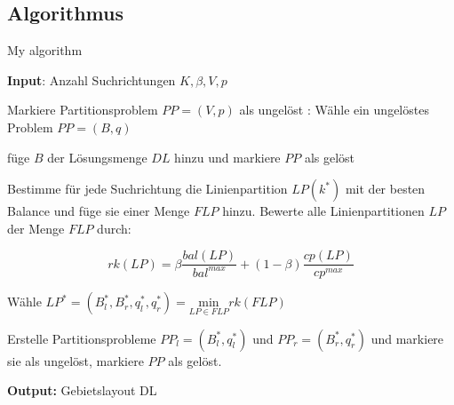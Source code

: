     \subsection{Algorithmus} %
    \label{sub:algorithmus}

      \begin{algorithm}
        \caption{My algorithm}\label{euclid}
        \textbf{Input}: Anzahl Suchrichtungen $K, \beta, V, p$
        \begin{algorithmic}[1]
          \State Markiere Partitionsproblem $PP = (V, p)$ als ungelöst
          :
            \State Wähle ein ungelöstes Problem $PP = (B, q)$
            
              \State füge $B$ der Lösungsmenge $DL$ hinzu und markiere $PP$ als gelöst
            \EndIf

              \State Bestimme für jede Suchrichtung die Linienpartition $LP(k^*)$ mit der besten Balance und füge sie einer Menge $FLP$ hinzu.
              \State Bewerte alle Linienpartitionen $LP$ der Menge $FLP$ durch:
              
                \begin{equation*}
                  rk(LP) = \beta\frac{bal(LP)}{bal^{max}} + (1 - \beta)\frac{cp(LP)}{cp^{max}}
                \end{equation*}

              \State Wähle $LP^{*} = (B_{l}^{*}, B_{r}^{*}, q_{l}^{*}, q_{r}^{*}) = \underset{LP \in FLP}{\text{min}}rk(FLP)$ 

              \State Erstelle Partitionsprobleme $PP_l = (B_{l}^{*}, q_{l}^{*})$ und $PP_r = (B_{r}^{*}, q_{r}^{*})$ und markiere sie als ungelöst, markiere $PP$ als gelöst.
            \EndIf
          \EndWhile
        \end{algorithmic}
        \textbf{Output:} Gebietslayout DL
      \end{algorithm}


    
        
       






    


